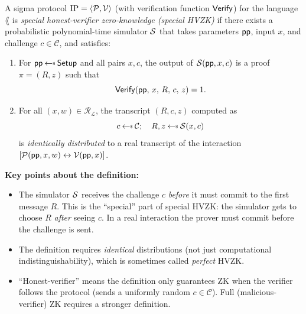 \documentclass[11pt]{article}
\begin{document}
\begin{tcolorbox}[title={Definition: Special HVZK for Sigma Protocols},
                  colback=blue!5, colframe=blue!40!black, breakable]
\begin{definition}
\label{def:shvzk}
A sigma protocol $\mathrm{IP} = \langle \mathcal{P}, \mathcal{V} \rangle$ (with verification
function $\mathsf{Verify}$) for the language $\lang$ is
\emph{special honest-verifier zero-knowledge (special HVZK)} if there exists a
probabilistic polynomial-time simulator $\mathcal{S}$ that takes parameters $\mathsf{pp}$,
input $x$, and challenge $c \in \mathcal{C}$, and satisfies:

\begin{enumerate}
  \item For $\pp \getsr \mathsf{Setup}$ and all pairs $x, c$, the output
        of $\mathcal{S}(\mathsf{pp}, x, c)$ is a proof $\pi = (R, z)$ such that
        \[
          \mathsf{Verify}(\mathsf{pp},\, x,\, R,\, c,\, z) = 1.
        \]

  \item For all $(x, w) \in \mathcal{R}_{\mathcal{L}}$, the transcript
        $(R, c, z)$ computed as
        \[
          c \getsr \mathcal{C};\quad R, z \getsr \Sim(x, c)
        \]
        is \emph{identically distributed} to a real transcript of the
        interaction $[\mathcal{P}(\mathsf{pp}, x, w) \leftrightarrow \mathcal{V}(\mathsf{pp}, x)]$.
\end{enumerate}
\end{definition}
\end{tcolorbox}

\noindent\textbf{Key points about the definition:}
\begin{itemize}
  \item The simulator $\mathcal{S}$ receives the challenge $c$ \emph{before} it must
        commit to the first message $R$.  This is the ``special'' part of
        special HVZK: the simulator gets to choose $R$ \emph{after} seeing $c$.
        In a real interaction the prover must commit before the challenge is
        sent.
  \item The definition requires \emph{identical} distributions (not just
        computational indistinguishability), which is sometimes called
        \emph{perfect} HVZK.
  \item ``Honest-verifier'' means the definition only guarantees ZK when the
        verifier follows the protocol (sends a uniformly random $c \in
        \mathcal{C}$).  Full (malicious-verifier) ZK requires a stronger
        definition.
\end{itemize}
\end{document}
